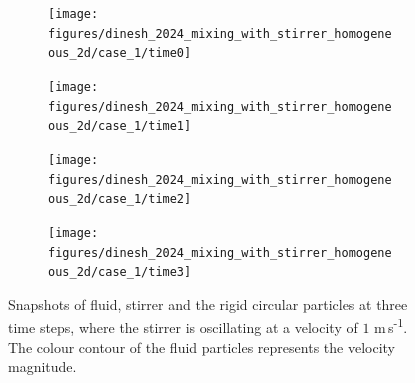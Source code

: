 \documentclass[a4paper,11pt]{book}
\begin{document}
\begin{figure}
  \centering
  \begin{subfigure}{0.48\textwidth}
    \centering
    \texttt{[image: figures/dinesh\_2024\_mixing\_with\_stirrer\_homogeneous\_2d/case\_1/time0]}
    \label{fig:1-mixing-1-a}
  \end{subfigure}
  \begin{subfigure}{0.48\textwidth}
    \centering
    \texttt{[image: figures/dinesh\_2024\_mixing\_with\_stirrer\_homogeneous\_2d/case\_1/time1]}
    \label{fig:1-mixing-1-b}
  \end{subfigure}
  \begin{subfigure}{0.48\textwidth}
    \centering
    \texttt{[image: figures/dinesh\_2024\_mixing\_with\_stirrer\_homogeneous\_2d/case\_1/time2]}
    \label{fig:1-mixing-1-c}
  \end{subfigure}
  \begin{subfigure}{0.48\textwidth}
    \centering
    \texttt{[image: figures/dinesh\_2024\_mixing\_with\_stirrer\_homogeneous\_2d/case\_1/time3]}
    \label{fig:1-mixing-1-d}
  \end{subfigure}
  \caption{Snapshots of fluid, stirrer and the rigid circular particles at
    three time steps, where the stirrer is oscillating at a velocity of $1$
    m\,s\textsuperscript{-1}. The colour contour of the fluid particles
    represents the velocity magnitude.}
\label{fig:1-mixing-1}
\end{figure}
\end{document}
